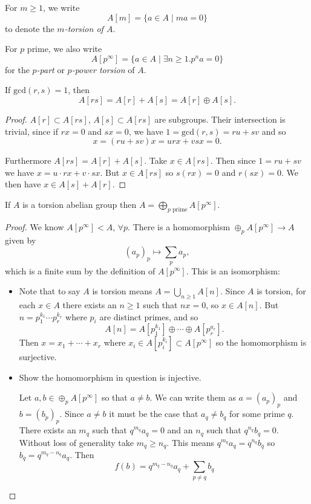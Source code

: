 \begin{defn}
For $m \geq 1$, we write
$$
A[m] = \{ a \in A \mid m a = 0 \}
$$
to denote the \emph{$m$-torsion of $A$}.

For $p$ prime, we also write
$$
A[p^\infty] = \{ a \in A \mid \exists n \geq 1 . p^n a = 0 \}
$$
for the \emph{$p$-part} or \emph{$p$-power torsion} of $A$.
\end{defn}

\begin{lemma}
If $\mathrm{gcd}(r, s) = 1$, then
$$
A[rs] = A[r] + A[s] = A[r] \oplus A[s].
$$
\end{lemma}
\begin{proof}
$A[r] \subset A[rs]$, $A[s] \subset A[rs]$ are subgroups. Their
intersection is trivial, since if $r x = 0$ and $s x = 0$, we have
$1 = \mathrm{gcd}(r, s) = ru + sv$ and so
$$
x = (ru + sv)x = urx + vsx = 0.
$$

Furthermore $A[rs] = A[r] + A[s]$. Take
$x \in A[rs]$. Then since $1 = r u + s v$ we have
$x = u \cdot rx + v \cdot sx$. But $x \in A[rs]$ so
$s(rx) = 0$ and $r(sx) = 0$. We
then have $x \in A[s] + A[r]$.
\end{proof}

\begin{theorem}
If $A$ is a torsion abelian group then
$A = \bigoplus_{p \text{ prime}} A[p^\infty]$.
\end{theorem}
\begin{proof}
We know $A[p^\infty] < A$, $\forall p$. There is a homomorphism
$\oplus_p A[p^\infty] \to A$ given by
$$
(a_p)_p \mapsto \sum_p a_p,
$$
which is a finite sum by the definition of $A[p^\infty]$. This is an
isomorphism:
\begin{itemize}
\item{
  Note that to say $A$ is torsion means $A = \bigcup_{n \geq 1} A[n]$.
  Since $A$ is torsion, for each $x \in A$ there exists an $n \geq 1$
  such that $n x = 0$, so $x \in A[n]$. But
  $n = p_1^{k_1} \cdots p_r^{k_r}$ where $p_i$ are distinct primes,
  and so
  $$
  A[n] = A[p_1^{k_1}] \oplus \cdots \oplus A[p_r^{a_r}].
  $$
  Then $x = x_1 + \cdots + x_r$ where
  $x_i \in A[p_i^{k_i}] \subset A[p^\infty]$ so the homomorphism is surjective.
}
\item
{
  \begin{Problem}
    Show the homomorphism in question is injective.
  \end{Problem}
  \begin{Answer}
    Let $a, b \in \oplus_p A[p^\infty]$ so that
    $a \neq b$. We can write them as
    $a = (a_p)_p$ and $b = (b_p)_p$. Since $a \neq b$ it must be the
    case that $a_q \neq b_q$ for some prime $q$. There
    exists an $m_q$ such that $q^{m_q} a_q = 0$ and an $n_q$ such
    that $q^{n_q} b_q = 0$. Without loss of generality take $m_q \geq
    n_q$. This means $q^{m_q} a_q = q^{n_q} b_q$ so $b_q = q^{m_q -
      n_q} a_q$. Then
    $$
    f(b) = q^{m_q - n_q} a_q + \sum_{p \neq q} b_q
    $$
  \end{Answer}
}
\end{itemize}
\end{proof}

